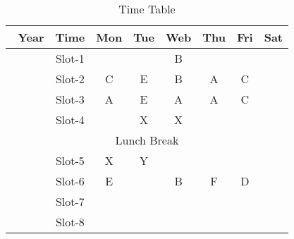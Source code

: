 \documentclass{article}
\begin{document}
	\begin{table}[h]
	

  \begin{tabular}{|c|c|c|c|c|c|c|c|}
  	    \hline\
  	    \textbf{Year}& \textbf{Time} & \textbf{Mon} & \textbf{Tue} & \textbf{Web} & \textbf{Thu} & \textbf{Fri} & \textbf{Sat} \\
  	    \hline
  	         &Slot-1 & & &  \cellcolor{red}B & &&\\
  	         \hline
  	          & Slot-2& \cellcolor{orange}C &\cellcolor{yellow}E &\cellcolor{red}B &\cellcolor{blue}A& \cellcolor{orange}C  &\\
  	         
  	           \hline
  	          & Slot-3& \cellcolor{blue}A &\cellcolor{yellow}E &\cellcolor{blue}A &\cellcolor{blue}A& \cellcolor{orange}C  &\\
  	           \hline
  	          & Slot-4& &\cellcolor{green}X &\cellcolor{green}X & &  &\\
  	           \hline
  	           \multicolumn{8}{|c|}{Lunch Break}\\
  	             
  	             \hline
  	             
  	          & Slot-5& \cellcolor{green}X &\cellcolor{pink}Y &\cellcolor{red} &\cellcolor{yellow}& \cellcolor{pink} &\\
  	          
  	          \hline
  	          
  	          & Slot-6& \cellcolor{yellow}E & &\cellcolor{red}B &\cellcolor{yellow}F& \cellcolor{pink}D &\\
  	             	         
  	          \cline{2-4}
  	          &Slot-7& & &\cellcolor{red} &\cellcolor{yellow} &\cellcolor{pink} & \\
  	          \hline
  	    
  	     &Slot-8 & & & & & & \\
  	    
  	
  	    
 \hline
  \end{tabular}

  	    
\caption{Time Table}
\label{tab:example}           


 	\end{table}
\end{document}
